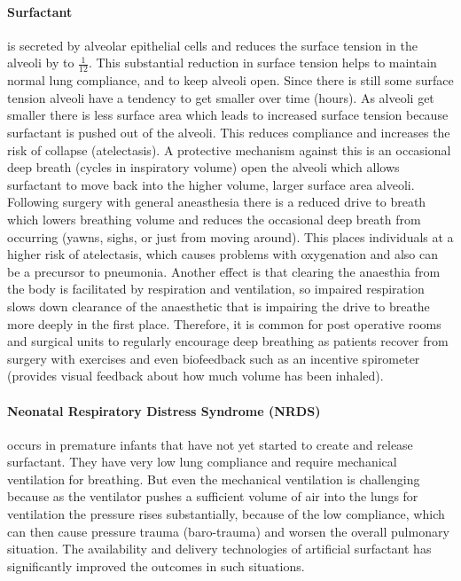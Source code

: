 \paragraph{Surfactant} is secreted by alveolar epithelial cells and reduces the surface tension in the alveoli by to $\frac{1}{12}$. This substantial reduction in surface tension helps to maintain normal lung compliance, and to keep alveoli open. Since there is still some surface tension alveoli have a tendency to get smaller over time (hours). As alveoli get smaller there is less surface area which leads to increased surface tension because surfactant is pushed out of the alveoli. This reduces compliance and increases the risk of collapse (atelectasis). A protective mechanism against this is an occasional deep breath (cycles in inspiratory volume) open the alveoli which allows surfactant to move back into the higher volume, larger surface area alveoli. Following surgery with general aneasthesia there is a reduced drive to breath which lowers breathing volume and reduces the occasional deep breath from occurring (yawns, sighs, or just from moving around). This places individuals at a higher risk of atelectasis, which causes problems with oxygenation and also can be a precursor to pneumonia. Another effect is that clearing the anaesthia from the body is facilitated by respiration and ventilation, so impaired respiration slows down clearance of the anaesthetic that is impairing the drive to breathe more deeply in the first place. Therefore, it is common for post operative rooms and surgical units to regularly encourage deep breathing as patients recover from surgery with exercises and even biofeedback such as an incentive spirometer (provides visual feedback about how much volume has been inhaled). 

\paragraph{Neonatal Respiratory Distress Syndrome (NRDS)} occurs in premature infants that have not yet started to create and release surfactant. They have very low lung compliance and require mechanical ventilation for breathing. But even the mechanical ventilation is challenging because as the ventilator pushes a sufficient volume of air into the lungs for ventilation the pressure rises substantially, because of the low compliance, which can then cause pressure trauma (baro-trauma) and worsen the overall pulmonary situation. The availability and delivery technologies of artificial surfactant has significantly improved the outcomes in such situations.


